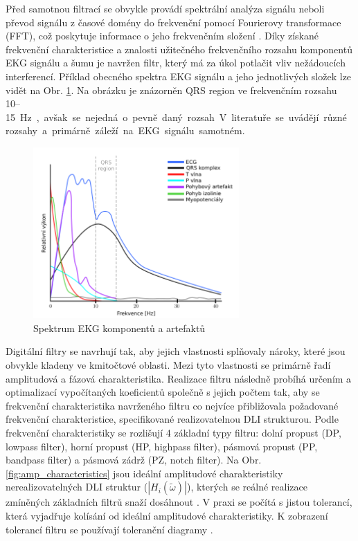 Před samotnou filtrací se obvykle provádí spektrální analýza signálu neboli
převod signálu z časové domény do frekvenční pomocí Fourierovy transformace
(FFT), což poskytuje informace o jeho frekvenčním složení \cite{Prchal2000}.
Díky získané frekvenční charakteristice a znalosti užitečného frekvenčního
rozsahu komponentů EKG signálu a šumu je navržen filtr, který má za úkol
potlačit vliv nežádoucích interferencí. Příklad obecného spektra EKG signálu a
jeho jednotlivých složek lze vidět na Obr. \ref{fig:ecg_spectrum}. Na obrázku je
znázorněn QRS region ve frekvenčním rozsahu 10--15~\si\Hz, avšak se nejedná o
pevně daný rozsah. V literatuře se uvádějí různé rozsahy a primárně záleží na
EKG signálu samotném.

\begin{figure}[h]
	\begin{center}
		\includegraphics[width=0.7\textwidth]{../assets/figures/ecg_spectrum}
		\caption{Spektrum EKG komponentů a artefaktů}
		\label{fig:ecg_spectrum}
	\end{center}
\end{figure}

Digitální filtry se navrhují tak, aby jejich vlastnosti splňovaly nároky, které
jsou obvykle kladeny ve kmitočtové oblasti. Mezi tyto vlastnosti se primárně
řadí amplitudová a fázová charakteristika. Realizace filtru následně probíhá
určením a optimalizací vypočítaných koeficientů společně s jejich počtem tak,
aby se frekvenční charakteristika navrženého filtru co nejvíce přibližovala
požadované frekvenční charakteristice, specifikované realizovatelnou DLI
strukturou. Podle frekvenční charakteristiky se rozlišují 4 základní typy
filtru: dolní propust (DP, lowpass filter), horní propust (HP, highpass filter),
pásmová propust (PP, bandpass filter) a pásmová zádrž (PZ, notch filter). Na
Obr. \ref{fig:amp_characteristics} jsou ideální amplitudové charakteristiky
nerealizovatelných DLI struktur ($|H_i(\widetilde\omega)|$), kterých se reálné
realizace zmíněných základních filtrů snaží dosáhnout
\cite{Skop1994,Prchal2000}. V praxi se počítá s jistou tolerancí, která
vyjadřuje kolísání od ideální amplitudové charakteristiky. K zobrazení tolerancí
filtru se používají toleranční diagramy \cite{Prchal2000,Lyons1997}.

